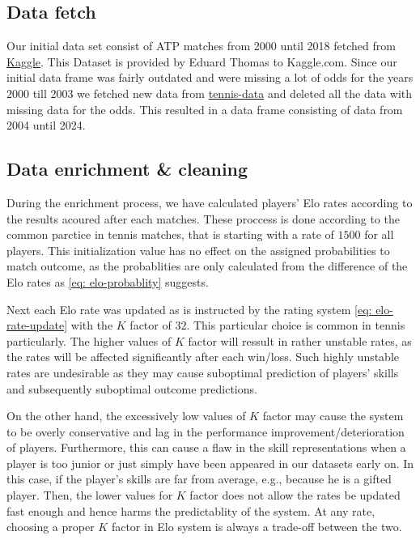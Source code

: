 \documentclass[preprint,aps,nofootinbib,a4paper,superscriptaddress,longbibliography,amsfonts,amssymb,amsmath,titlepage]{revtex4-2}
\begin{document}
\subsection{Data fetch}

Our initial data set consist of ATP matches from 2000 until 2018 fetched from \href{https://www.kaggle.com/datasets/edouardthomas/atp-matches-dataset}{Kaggle}. This Dataset is provided by Eduard Thomas to Kaggle.com. Since our initial data frame was fairly outdated and were missing a lot of odds for the years 2000 till 2003 we fetched new data from \href{http://tennis-data.co.uk/}{tennis-data} and deleted all the data with missing data for the odds. This resulted in a data frame consisting of data from 2004 until 2024.

\subsection{Data enrichment \& cleaning}

During the enrichment process, we have calculated players' Elo rates according to the results acoured after each matches. These proccess is done according to the common parctice in tennis matches, that is starting with a rate of $1500$ for all players. This initialization value has no effect on the assigned probabilities to match outcome, as the probablities are only calculated from the difference of the Elo rates as \eqref{eq: elo-probablity} suggests.

Next each Elo rate was updated as is instructed by the rating system \eqref{eq: elo-rate-update} with the $K$ factor of $32$. This particular choice is common in tennis particularly. The higher values of $K$ factor will ressult in rather unstable rates, as the rates will be affected significantly after each win/loss. Such highly unstable rates are undesirable as they may cause suboptimal prediction of players' skills and subsequently suboptimal outcome predictions.

On the other hand, the excessively low values of $K$ factor may cause the system to be overly conservative and lag in the performance improvement/deterioration of players. Furthermore, this can cause a flaw in the skill representations when a player is too junior or just simply have been appeared in our datasets early on. In this case, if the player's skills are far from average, e.g., because he is a gifted player. Then, the lower values for $K$ factor does not allow the rates be updated fast enough and hence harms the predictablity of the system. At any rate, choosing a proper $K$ factor in Elo system is always a trade-off between the two.
\end{document}

